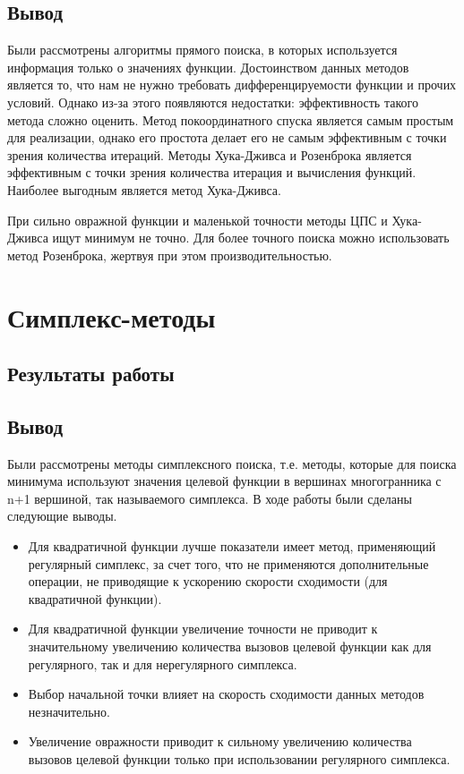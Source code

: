 \documentclass[12pt, a4paper]{article}
\begin{document}
\subsection{Вывод}

Были рассмотрены алгоритмы прямого поиска, в которых используется информация только о значениях функции. Достоинством данных методов является то, что нам не нужно требовать дифференцируемости функции и прочих условий. Однако из-за этого появляются недостатки: эффективность такого метода сложно оценить. Метод покоординатного спуска является самым простым для реализации, однако его простота делает его не самым эффективным с точки зрения количества итераций. Методы Хука-Дживса и Розенброка является эффективным с точки зрения количества итерация и вычисления функций. Наиболее выгодным является метод Хука-Дживса.

При сильно овражной функции и маленькой точности методы ЦПС и Хука-Дживса ищут минимум не точно. Для более точного поиска можно использовать метод Розенброка, жертвуя при этом производительностью.

\section{Симплекс-методы}

\subsection{Результаты работы}



\vspace*{1cm}

\subsection{Вывод}

Были рассмотрены методы симплексного поиска, т.е. методы, которые для поиска минимума используют значения целевой функции в вершинах многогранника с n+1 вершиной, так называемого симплекса. В ходе работы были сделаны следующие выводы.
\begin{itemize}
	\item Для квадратичной функции лучше показатели имеет метод, применяющий регулярный симплекс, за счет того, что не применяются дополнительные операции, не приводящие к ускорению скорости сходимости (для квадратичной функции).
	\item Для квадратичной функции увеличение точности не приводит к значительному увеличению количества вызовов целевой функции как для регулярного, так и для нерегулярного симплекса.
	\item Выбор начальной точки влияет на скорость сходимости данных методов незначительно.
	\item Увеличение овражности приводит к сильному увеличению количества вызовов целевой функции только при использовании регулярного симплекса.
\end{itemize} 
\end{document}
